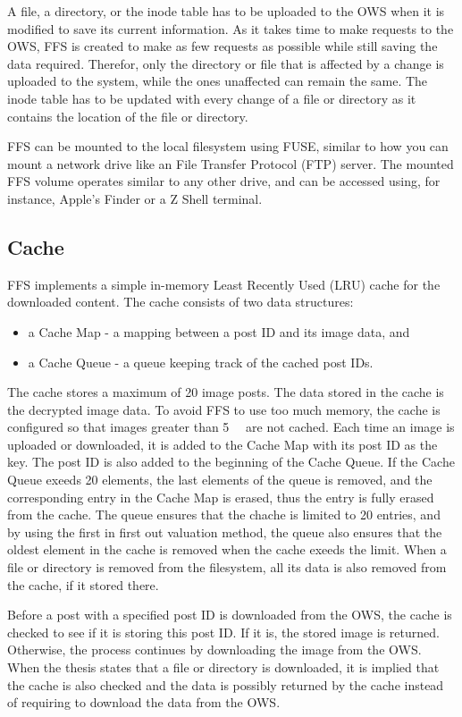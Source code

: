 A file, a directory, or the inode table has to be uploaded to the OWS when it is modified to save its current information. As it takes time to make requests to the OWS, FFS is created to make as few requests as possible while still saving the data required. Therefor, only the directory or file that is affected by a change is uploaded to the system, while the ones unaffected can remain the same. The inode table has to be updated with every change of a file or directory as it contains the location of the file or directory.

FFS can be mounted to the local filesystem using FUSE, similar to how you can mount a network drive like an File Transfer Protocol (\gls{FTP}) server. The mounted FFS volume operates similar to any other drive, and can be accessed using, for instance, Apple's Finder or a Z Shell terminal.

\subsection{Cache}
FFS implements a simple in-memory Least Recently Used (\gls{LRU}) cache for the downloaded content. The cache consists of two data structures: 
\begin{itemize}
	\item a Cache Map - a mapping between a post ID and its image data, and
	\item a Cache Queue - a queue keeping track of the cached post IDs.
\end{itemize}
The cache stores a maximum of 20 image posts. The data stored in the cache is the decrypted image data. To avoid FFS to use too much memory, the cache is configured so that images greater than \SI{5}{\mega\byte} are not cached. Each time an image is uploaded or downloaded, it is added to the Cache Map with its post ID as the key. The post ID is also added to the beginning of the Cache Queue. If the Cache Queue exeeds 20 elements, the last elements of the queue is removed, and the corresponding entry in the Cache Map is erased, thus the entry is fully erased from the cache. The queue ensures that the chache is limited to 20 entries, and by using the first in first out valuation method, the queue also ensures that the oldest element in the cache is removed when the cache exeeds the limit. When a file or directory is removed from the filesystem, all its data is also removed from the cache, if it stored there.

Before a post with a specified post ID is downloaded from the OWS, the cache is checked to see if it is storing this post ID. If it is, the stored image is returned. Otherwise, the process continues by downloading the image from the OWS. When the thesis states that a file or directory is downloaded, it is implied that the cache is also checked and the data is possibly returned by the cache instead of requiring to download the data from the OWS.

